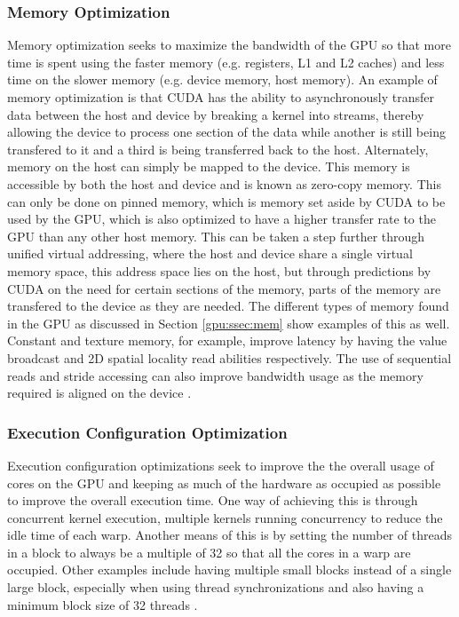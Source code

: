 \subsubsection{Memory Optimization}
Memory optimization seeks to maximize the bandwidth of the GPU so that more time is spent using the faster memory (e.g. registers, L1 and L2 caches) and less time on the slower memory (e.g. device memory, host memory). An example of memory optimization is that CUDA has the ability to asynchronously transfer data between the host and device by breaking a kernel into streams, thereby allowing the device to process one section of the data while another is still being transfered to it and a third is being transferred back to the host. Alternately, memory on the host can simply be mapped to the device. This memory is accessible by both the host and device and is known as zero-copy memory. This can only be done on pinned memory, which is memory set aside by CUDA to be used by the GPU, which is also optimized to have a higher transfer rate to the GPU than any other host memory. This can be taken a step further through unified virtual addressing, where the host and device share a single virtual memory space, this address space lies on the host, but through predictions by CUDA on the need for certain sections of the memory, parts of the memory are transfered to the device as they are needed. The different types of memory found in the GPU as discussed in Section \ref{gpu:ssec:mem} show examples of this as well. Constant and texture memory, for example, improve latency by having the value broadcast and 2D spatial locality read abilities respectively. The use of sequential reads and stride accessing can also improve bandwidth usage as the memory required is aligned on the device \citep{CUDA_BPG}.
%
\subsubsection{Execution Configuration Optimization}
Execution configuration optimizations seek to improve the the overall usage of cores on the GPU and keeping as much of the hardware as occupied as possible to improve the overall execution time. One way of achieving this is through concurrent kernel execution, multiple kernels running concurrency to reduce the idle time of each warp. Another means of this is by setting the number of threads in a block to always be a multiple of 32 so that all the cores in a warp are occupied. Other examples include having multiple small blocks instead of a single large block, especially when using thread synchronizations and also having a minimum block size of 32 threads \citep{CUDA_BPG}.
%
